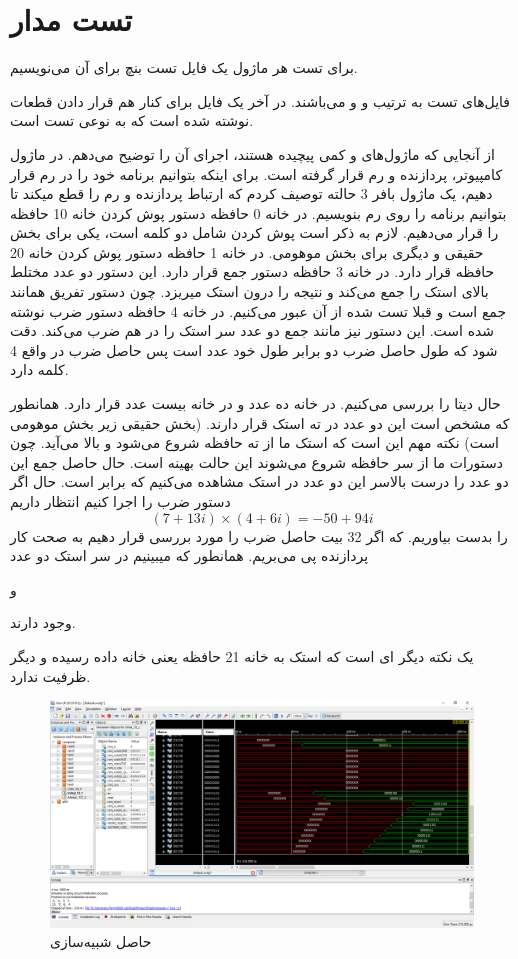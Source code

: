 \documentclass[fleqn]{article}
\begin{document}
\section{تست مدار}
برای تست هر ماژول یک فایل تست بنچ برای آن می‌نویسیم.

فایل‌های تست به ترتیب 
و 
و 
می‌باشند. در آخر یک فایل 
برای کنار هم قرار دادن قطعات نوشته شده است که به نوعی تست 
است.

از آنجایی که ماژول‌های 
و 
کمی پیچیده هستند، اجرای آن را توضیح می‌دهم. در ماژول کامپیوتر، پردازنده و رم قرار گرفته است. برای 
اینکه بتوانیم برنامه خود را در رم قرار دهیم، یک ماژول بافر 3 حالته توصیف کردم که ارتباط پردازنده و 
رم را قطع میکند تا بتوانیم برنامه را روی رم بنویسیم. 
در خانه 0 حافظه دستور پوش کردن خانه 10 حافظه را قرار می‌دهیم. 
لازم به ذکر است پوش کردن شامل دو کلمه است، یکی برای بخش حقیقی و دیگری برای بخش موهومی. 
در خانه 1 حافظه دستور پوش کردن خانه 20 حافظه قرار دارد. در خانه 3 حافظه دستور جمع قرار دارد. 
این دستور دو عدد مختلط بالای استک را جمع می‌کند و نتیجه را درون استک میریزد. چون دستور تفریق همانند جمع است و قبلا تست شده از 
آن عبور می‌کنیم. در خانه 4 حافظه دستور ضرب نوشته شده است. این دستور نیز مانند جمع دو عدد سر استک 
را در هم ضرب می‌کند. دقت شود که طول حاصل ضرب دو برابر طول خود عدد است پس حاصل ضرب در واقع 4 کلمه دارد.

حال دیتا را بررسی می‌کنیم. در خانه ده عدد 
و در خانه بیست عدد 
قرار دارد. همانطور که مشخص است این دو عدد در ته استک قرار دارند. (بخش حقیقی زیر بخش موهومی است)
نکته مهم این است که استک ما از ته حافظه شروع می‌شود و بالا می‌آید. چون دستورات ما از سر حافظه شروع می‌شوند این حالت 
بهینه است. حال حاصل جمع این دو عدد را درست بالاسر این دو عدد در استک مشاهده می‌کنیم که برابر 
است. حال اگر دستور ضرب را اجرا کنیم انتظار داریم 
$$
(7+13i)\times(4+6i) = -50 + 94i
$$
را بدست بیاوریم. که اگر 32 بیت حاصل ضرب را مورد بررسی قرار دهیم به صحت کار پردازنده پی می‌بریم. همانطور که 
میبینیم در سر استک دو عدد 

 و 

وجود دارند. 

یک نکته دیگر ای است که استک به خانه 21 حافظه یعنی خانه داده رسیده و دیگر ظرفیت ندارد.

\begin{figure}[!htbp]
	\centering
	\includegraphics[width=\linewidth]{mem.png}
	\caption{حاصل شبیه‌سازی }
\end{figure}
\end{document}
